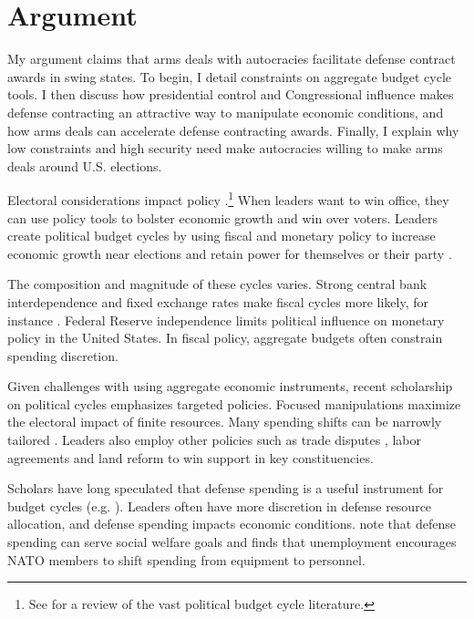 \documentclass[12pt]{article}
\begin{document}
\section{Argument}


My argument claims that arms deals with autocracies facilitate defense contract awards in swing states.
To begin, I detail constraints on aggregate budget cycle tools.
I then discuss how presidential control and Congressional influence makes defense contracting an attractive way to manipulate economic conditions, and how arms deals can accelerate defense contracting awards. 
Finally, I explain why low constraints and high security need make autocracies willing to make arms deals around U.S. elections.


Electoral considerations impact policy \citep{Nordhaus1975}.\footnote{See \citet{Dubois2016} for a review of the vast political budget cycle literature.} 
When leaders want to win office, they can use policy tools to bolster economic growth and win over voters. 
Leaders create political budget cycles by using fiscal and monetary policy to increase economic growth near elections and retain power for themselves or their party \citep{Tufte1978, Rogoff1987}. 


The composition and magnitude of these cycles varies. 
Strong central bank interdependence and fixed exchange rates make fiscal cycles more likely, for instance \citep{ClarkHallerberg2000}. 
Federal Reserve independence limits political influence on monetary policy in the United States. 
In fiscal policy, aggregate budgets often constrain spending discretion.


Given challenges with using aggregate economic instruments, recent scholarship on political cycles emphasizes targeted policies.
Focused manipulations maximize the electoral impact of finite resources.
Many spending shifts can be narrowly tailored \citep[pg. 248]{Dubois2016}.
Leaders also employ other policies such as trade disputes \citep{Conconietal2017}, labor agreements \citep{Ahlquist2010} and land reform \citep{Philips2020} to win support in key constituencies.


Scholars have long speculated that defense spending is a useful instrument for budget cycles (e.g. \cite{Tufte1978, Mintz1988}).
Leaders often have more discretion in defense resource allocation, and defense spending impacts economic conditions.
\citet{WhittenWilliams2011} note that defense spending can serve social welfare goals and \citet{Becker2021} finds that unemployment encourages NATO members to shift spending from equipment to personnel.
\end{document}
